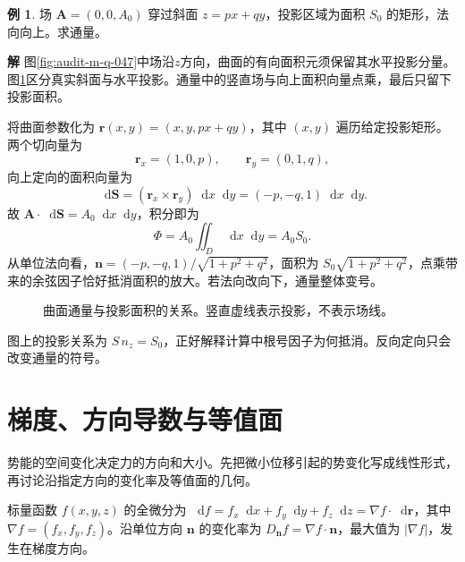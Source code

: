\documentclass[11pt,openany,fontset=fandol]{ctexbook}
\theoremstyle{plain}\newtheorem{theorem}{定理}[chapter]\newtheorem{proposition}[theorem]{命题}
\theoremstyle{definition}\newtheorem{definition}{定义}[chapter]\newtheorem{example}{例}[chapter]
\theoremstyle{remark}\newtheorem*{remark}{说明}
\newcommand{\SolutionStart}{\par\nobreak\medskip\nobreak\noindent\textbf{解}\quad\ignorespaces}
\newenvironment{solution}{\SolutionStart}{\par\medskip}
\newcommand{\dd}{\mathop{}\!\mathrm d}\newcommand{\ii}{\mathrm i}\newcommand{\ee}{\mathrm e}
\newcommand{\vct}[1]{\bm{#1}}\newcommand{\Rea}{\operatorname{Re}}\newcommand{\Ima}{\operatorname{Im}}
\begin{document}
\begin{example}
场 $\vct A=(0,0,A_0)$ 穿过斜面 $z=px+qy$，投影区域为面积 $S_0$ 的矩形，法向向上。求通量。
\end{example}

\begin{solution}
图\ref{fig:audit-m-q-047}中场沿$z$方向，曲面的有向面积元须保留其水平投影分量。
图\ref{fig:orig-035}区分真实斜面与水平投影。通量中的竖直场与向上面积向量点乘，最后只留下投影面积。

将曲面参数化为 $\vct r(x,y)=(x,y,px+qy)$，其中 $(x,y)$ 遍历给定投影矩形。两个切向量为
\[
\vct r_x=(1,0,p),\qquad\vct r_y=(0,1,q),
\]
向上定向的面积向量为
\[
\dd\vct S=(\vct r_x\times\vct r_y)\dd x\dd y
=(-p,-q,1)\dd x\dd y.
\]
故 $\vct A\cdot\dd\vct S=A_0\dd x\dd y$，积分即为
\[
\Phi=A_0\iint_{D}\dd x\dd y=A_0S_0.
\]
从单位法向看，$\vct n=(-p,-q,1)/\sqrt{1+p^2+q^2}$，面积为 $S_0\sqrt{1+p^2+q^2}$，点乘带来的余弦因子恰好抵消面积的放大。若法向改向下，通量整体变号。

\begin{figure}[H]\centering
{}
\caption{曲面通量与投影面积的关系。竖直虚线表示投影，不表示场线。}
\label{fig:orig-035}
\end{figure}

图上的投影关系为 $S\,n_z=S_0$，正好解释计算中根号因子为何抵消。反向定向只会改变通量的符号。
\end{solution}

\section{梯度、方向导数与等值面}
势能的空间变化决定力的方向和大小。先把微小位移引起的势变化写成线性形式，再讨论沿指定方向的变化率及等值面的几何。

标量函数 $f(x,y,z)$ 的全微分为 $\dd f=f_x\dd x+f_y\dd y+f_z\dd z=\nabla f\cdot\dd\vct r$，其中 $\nabla f=(f_x,f_y,f_z)$。沿单位方向 $\vct n$ 的变化率为 $D_{\vct n}f=\nabla f\cdot\vct n$，最大值为 $|\nabla f|$，发生在梯度方向。
\end{document}
